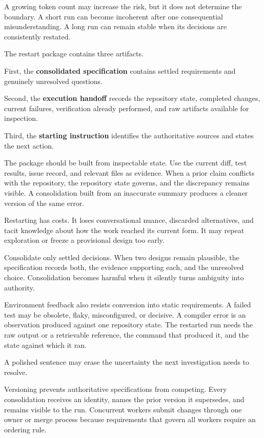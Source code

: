 A growing token count may increase the risk, but it does not determine the boundary. A short run can become incoherent after one consequential misunderstanding. A long run can remain stable when its decisions are consistently restated.

The restart package contains three artifacts.

First, the \textbf{consolidated specification} contains settled requirements and genuinely unresolved questions.

Second, the \textbf{execution handoff} records the repository state, completed changes, current failures, verification already performed, and raw artifacts available for inspection.

Third, the \textbf{starting instruction} identifies the authoritative sources and states the next action.

The package should be built from inspectable state. Use the current diff, test results, issue record, and relevant files as evidence. When a prior claim conflicts with the repository, the repository state governs, and the discrepancy remains visible. A consolidation built from an inaccurate summary produces a cleaner version of the same error.

Restarting has costs. It loses conversational nuance, discarded alternatives, and tacit knowledge about how the work reached its current form. It may repeat exploration or freeze a provisional design too early.

Consolidate only settled decisions. When two designs remain plausible, the specification records both, the evidence supporting each, and the unresolved choice. Consolidation becomes harmful when it silently turns ambiguity into authority.

Environment feedback also resists conversion into static requirements. A failed test may be obsolete, flaky, misconfigured, or decisive. A compiler error is an observation produced against one repository state. The restarted run needs the raw output or a retrievable reference, the command that produced it, and the state against which it ran.

A polished sentence may erase the uncertainty the next investigation needs to resolve.

Versioning prevents authoritative specifications from competing. Every consolidation receives an identity, names the prior version it supersedes, and remains visible to the run. Concurrent workers submit changes through one owner or merge process because requirements that govern all workers require an ordering rule.


